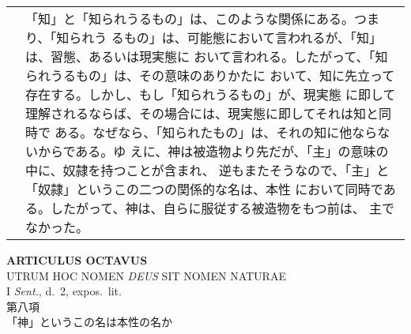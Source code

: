 \documentclass[10pt]{jsarticle} %
\begin{document}
\begin{longtable}{p{21em}p{21em}}
&

「知」と「知られうるもの」は、このような関係にある。つまり、「知られう
るもの」は、可能態において言われるが、「知」は、習態、あるいは現実態に
おいて言われる。したがって、「知られうるもの」は、その意味のありかたに
おいて、知に先立って存在する。しかし、もし「知られうるもの」が、現実態
に即して理解されるならば、その場合には、現実態に即してそれは知と同時で
ある。なぜなら、「知られたもの」は、それの知に他ならないからである。ゆ
えに、神は被造物より先だが、「主」の意味の中に、奴隷を持つことが含まれ、
逆もまたそうなので、「主」と「奴隷」というこの二つの関係的な名は、本性
において同時である。したがって、神は、自らに服従する被造物をもつ前は、
主でなかった。




\end{longtable}
\newpage
{}

\begin{center}
 {\Large {\bf ARTICULUS OCTAVUS}}\\
 {\large UTRUM HOC NOMEN {\itshape DEUS} SIT NOMEN NATURAE}\\
 {\footnotesize I {\itshape Sent.}, d.~2, expos.~lit.}\\
 {\Large 第八項\\「神」というこの名は本性の名か}
\end{center}
\end{document}

